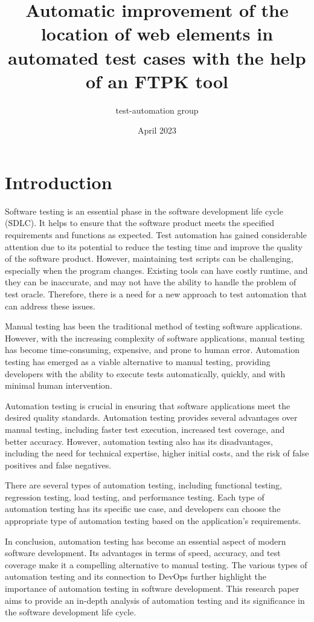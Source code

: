 \documentclass{article}
\title{Automatic improvement of the location of web elements in automated test cases with the help of an FTPK tool}
\author{test-automation group}
\date{April 2023}
\begin{document}
\maketitle

\section{Introduction}

Software testing is an essential phase in the software development life cycle (SDLC). It helps to ensure that the software product meets the specified requirements and functions as expected. Test automation has gained considerable attention due to its potential to reduce the testing time and improve the quality of the software product. However, maintaining test scripts can be challenging, especially when the program changes\cite{gui_testing, gui_test_costs}. Existing tools can have costly runtime, and they can be inaccurate, and may not have the ability to handle the problem of test oracle\cite{test_oracle_ai}. Therefore, there is a need for a new approach to test automation that can address these issues.

Manual testing has been the traditional method of testing software applications. However, with the increasing complexity of software applications, manual testing has become time-consuming, expensive, and prone to human error\cite{gui_test_costs}. Automation testing has emerged as a viable alternative to manual testing, providing developers with the ability to execute tests automatically, quickly, and with minimal human intervention.

Automation testing is crucial in ensuring that software applications meet the desired quality standards. Automation testing provides several advantages over manual testing, including faster test execution, increased test coverage, and better accuracy. However, automation testing also has its disadvantages, including the need for technical expertise, higher initial costs, and the risk of false positives and false negatives.

There are several types of automation testing, including functional testing, regression testing, load testing, and performance testing. Each type of automation testing has its specific use case, and developers can choose the appropriate type of automation testing based on the application's requirements.

In conclusion, automation testing has become an essential aspect of modern software development. Its advantages in terms of speed, accuracy, and test coverage make it a compelling alternative to manual testing. The various types of automation testing and its connection to DevOps further highlight the importance of automation testing in software development. This research paper aims to provide an in-depth analysis of automation testing and its significance in the software development life cycle.
\end{document}
